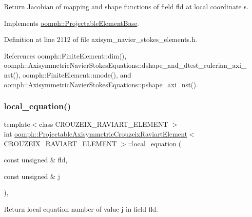 Return Jacobian of mapping and shape functions of field fld at local coordinate s. 



Implements \hyperlink{classoomph_1_1ProjectableElementBase_ad45c21b58c0985d52f68ab2d79cbb488}{oomph\+::\+Projectable\+Element\+Base}.



Definition at line 2112 of file axisym\+\_\+navier\+\_\+stokes\+\_\+elements.\+h.



References oomph\+::\+Finite\+Element\+::dim(), oomph\+::\+Axisymmetric\+Navier\+Stokes\+Equations\+::dshape\+\_\+and\+\_\+dtest\+\_\+eulerian\+\_\+axi\+\_\+nst(), oomph\+::\+Finite\+Element\+::nnode(), and oomph\+::\+Axisymmetric\+Navier\+Stokes\+Equations\+::pshape\+\_\+axi\+\_\+nst().

\mbox{\label{classoomph_1_1ProjectableAxisymmetricCrouzeixRaviartElement_ad5ef8ba115e3e8db5f456a26a95ba7d1}} 
\subsubsection{\texorpdfstring{local\+\_\+equation()}{local\_equation()}}
{\footnotesize\ttfamily template$<$class C\+R\+O\+U\+Z\+E\+I\+X\+\_\+\+R\+A\+V\+I\+A\+R\+T\+\_\+\+E\+L\+E\+M\+E\+NT $>$ \\
int \hyperlink{classoomph_1_1ProjectableAxisymmetricCrouzeixRaviartElement}{oomph\+::\+Projectable\+Axisymmetric\+Crouzeix\+Raviart\+Element}$<$ C\+R\+O\+U\+Z\+E\+I\+X\+\_\+\+R\+A\+V\+I\+A\+R\+T\+\_\+\+E\+L\+E\+M\+E\+NT $>$\+::local\+\_\+equation (\begin{DoxyParamCaption}\item[{const unsigned \&}]{fld,  }\item[{const unsigned \&}]{j }\end{DoxyParamCaption})\hspace{0.3cm}{\ttfamily [inline]}, {\ttfamily [virtual]}}



Return local equation number of value j in field fld. 



